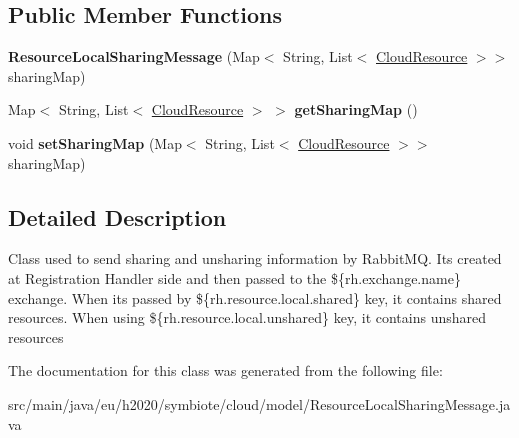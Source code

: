 \subsection*{Public Member Functions}
\begin{DoxyCompactItemize}
\item 
\mbox{\label{classeu_1_1h2020_1_1symbiote_1_1cloud_1_1model_1_1ResourceLocalSharingMessage_a4e09440a3b8d954b7e3527c84d5e8a57}} 
{\bfseries Resource\+Local\+Sharing\+Message} (Map$<$ String, List$<$ \hyperlink{classeu_1_1h2020_1_1symbiote_1_1cloud_1_1model_1_1internal_1_1CloudResource}{Cloud\+Resource} $>$$>$ sharing\+Map)
\item 
\mbox{\label{classeu_1_1h2020_1_1symbiote_1_1cloud_1_1model_1_1ResourceLocalSharingMessage_aafd9b4fe262f175a0b835beb2f754270}} 
Map$<$ String, List$<$ \hyperlink{classeu_1_1h2020_1_1symbiote_1_1cloud_1_1model_1_1internal_1_1CloudResource}{Cloud\+Resource} $>$ $>$ {\bfseries get\+Sharing\+Map} ()
\item 
\mbox{\label{classeu_1_1h2020_1_1symbiote_1_1cloud_1_1model_1_1ResourceLocalSharingMessage_a01503ffb3a7517942bab1507096dafaf}} 
void {\bfseries set\+Sharing\+Map} (Map$<$ String, List$<$ \hyperlink{classeu_1_1h2020_1_1symbiote_1_1cloud_1_1model_1_1internal_1_1CloudResource}{Cloud\+Resource} $>$$>$ sharing\+Map)
\end{DoxyCompactItemize}


\subsection{Detailed Description}
Class used to send sharing and unsharing information by Rabbit\+MQ. It\textquotesingle{}s created at Registration Handler side and then passed to the \$\{rh.\+exchange.\+name\} exchange. When it\textquotesingle{}s passed by \$\{rh.\+resource.\+local.\+shared\} key, it contains shared resources. When using \$\{rh.\+resource.\+local.\+unshared\} key, it contains unshared resources 

The documentation for this class was generated from the following file\+:\begin{DoxyCompactItemize}
\item 
src/main/java/eu/h2020/symbiote/cloud/model/Resource\+Local\+Sharing\+Message.\+java\end{DoxyCompactItemize}
